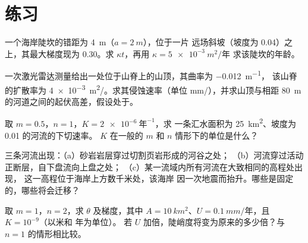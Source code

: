 \section{练习}

\begin{exercise}[$\star$]\label{exo:b3:quantitative-geomorphology:1}
一个海岸陡坎的错距为 \qty{4}{m}（$a = \qty{2}{m}$），位于一片
远场斜坡（坡度为 0.04）之上，其最大梯度现为 0.30。求
$\kappa t$，再用 $\kappa = \qty{5e-3}{m^2/\text{年}}$ 求该陡坎的年龄。
\end{exercise}

\begin{exercise}[$\star$]\label{exo:b3:quantitative-geomorphology:2}
一次激光雷达测量给出一处位于山脊上的山顶，其曲率为 \qty{-0.012}{m^{-1}}，
该山脊的扩散率为 \qty{4e-3}{m^2/}。求其侵蚀速率（单位
\unit{mm/}），并求山顶与相距
\qty{80}{m} 的河道之间的起伏高差，假设处于。
\end{exercise}

\begin{exercise}[$\star$]\label{exo:b3:quantitative-geomorphology:3}
取 $m = 0.5$，$n = 1$，$K = \qty{2e-6}{\text{年}^{-1}}$，求
一条汇水面积为 \qty{25}{km^2}、坡度为 0.01 的河流的下切速率。
$K$ 在一般的 $m$ 和 $n$ 情形下的单位是什么？
\end{exercise}

\begin{exercise}[$\star$]\label{exo:b3:quantitative-geomorphology:4}
三条河流出现：（a）砂岩岩层穿过切割页岩形成的河谷之处；
（b）河流穿过活动正断层，自下盘流向上盘之处；
（c）某一流域内所有河流在大致相同的高程处出现，
这一高程位于海岸上方数千米处，该海岸
因一次地震而抬升。哪些是固定的，哪些将会迁移？
\end{exercise}

\begin{exercise}[$\star\star$]\label{exo:b3:quantitative-geomorphology:5}
取 $m = 1$，$n = 2$，求 $\theta$ 及梯度，其中 $A =
\qty{10}{km^2}$、$U = \qty{0.1}{mm/\text{年}}$，且 $K = 10^{-9}$（以米和
年为单位）。
若 $U$ 加倍，陡峭度将变为原来的多少倍？与 $n =
1$ 的情形相比较。
\end{exercise}

